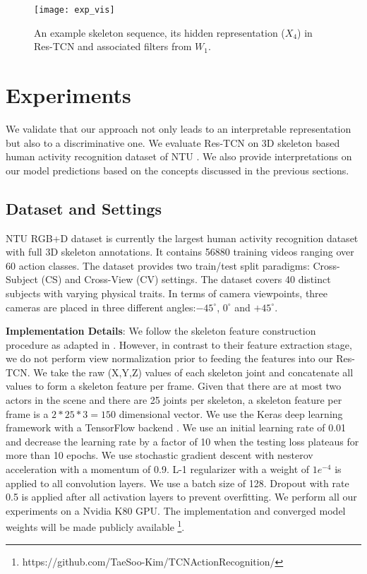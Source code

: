 \documentclass[10pt,twocolumn,letterpaper]{article}
\begin{document}
\begin{figure*}
\begin{center}
 \texttt{[image: exp\_vis]}
\end{center}
 \caption{An example skeleton sequence, its hidden representation ($X_4$) in Res-TCN and associated filters from $W_1$.}
\label{fig:exp_vis}
\end{figure*}

\section{Experiments}
We validate that our approach not only leads to an interpretable representation but also to a discriminative one. We evaluate Res-TCN on 3D skeleton based human activity recognition dataset of NTU \cite{nturgdb2016}. We also provide interpretations on our model predictions based on the concepts discussed in the previous sections.

\subsection{Dataset and Settings}
NTU RGB+D dataset \cite{nturgdb2016} is currently the largest human activity recognition dataset with full 3D skeleton annotations. It contains 56880 training videos ranging over 60 action classes. The dataset provides two train/test split paradigms: Cross-Subject (CS) and Cross-View (CV) settings. The dataset covers 40 distinct subjects with varying physical traits. In terms of camera viewpoints, three cameras are placed in three different angles:$-45^{\circ}$, $0^{\circ}$ and $+45^{\circ}$.

\textbf{Implementation Details}: We follow the skeleton feature construction procedure as adapted in \cite{nturgdb2016,Song2017}. However, in contrast to their feature extraction stage, we do not perform view normalization prior to feeding the features into our Res-TCN. We take the raw (X,Y,Z) values of each skeleton joint and concatenate all values to form a skeleton feature per frame. Given that there are at most two actors in the scene and there are 25 joints per skeleton, a skeleton feature per frame is a $2*25*3=150$ dimensional vector. We use the Keras deep learning framework \cite{keras} with a TensorFlow backend \cite{tensorflow}. We use an initial learning rate of 0.01 and decrease the learning rate by a factor of 10 when the testing loss plateaus for more than 10 epochs. We use stochastic gradient descent with nesterov acceleration with a momentum of 0.9. L-1 regularizer with a weight of $1e^{-4}$ is applied to all convolution layers. We use a batch size of 128. Dropout \cite{dropout} with rate 0.5 is applied after all activation layers to prevent overfitting. We perform all our experiments on a Nvidia K80 GPU. The implementation and converged model weights will be made publicly available \footnote{https://github.com/TaeSoo-Kim/TCNActionRecognition/}.
\end{document}
